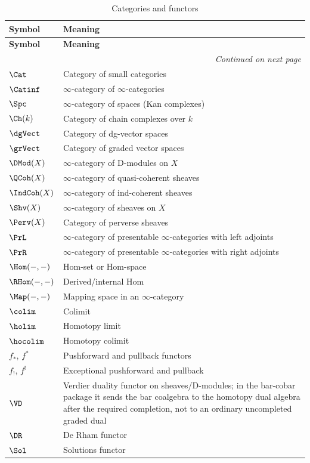 \begin{longtable}{p{3cm} p{10cm}}
\caption{Categories and functors} \\
\toprule
\textbf{Symbol} & \textbf{Meaning} \\
\midrule
\endfirsthead
\toprule
\textbf{Symbol} & \textbf{Meaning} \\
\midrule
\endhead
\midrule
\multicolumn{2}{r}{\textit{Continued on next page}} \\
\endfoot
\bottomrule
\endlastfoot

$\Cat$ & Category of small categories \\
$\Catinf$ & $\infty$-category of $\infty$-categories \\
$\Spc$ & $\infty$-category of spaces (Kan complexes) \\
$\Ch(k)$ & Category of chain complexes over $k$ \\
$\dgVect$ & Category of dg-vector spaces \\
$\grVect$ & Category of graded vector spaces \\
$\DMod(X)$ & $\infty$-category of D-modules on $X$ \\
$\QCoh(X)$ & $\infty$-category of quasi-coherent sheaves \\
$\IndCoh(X)$ & $\infty$-category of ind-coherent sheaves \\
$\Shv(X)$ & $\infty$-category of sheaves on $X$ \\
$\Perv(X)$ & Category of perverse sheaves \\
$\PrL$ & $\infty$-category of presentable $\infty$-categories with left adjoints \\
$\PrR$ & $\infty$-category of presentable $\infty$-categories with right adjoints \\
$\Hom(-, -)$ & Hom-set or Hom-space \\
$\RHom(-, -)$ & Derived/internal Hom \\
$\Map(-, -)$ & Mapping space in an $\infty$-category \\
$\colim$ & Colimit \\
$\holim$ & Homotopy limit \\
$\hocolim$ & Homotopy colimit \\
$f_*$, $f^*$ & Pushforward and pullback functors \\
$f_!$, $f^!$ & Exceptional pushforward and pullback \\
$\VD$ & Verdier duality functor on sheaves/D-modules; in the bar-cobar package it sends the bar coalgebra to the homotopy dual algebra after the required completion, not to an ordinary uncompleted graded dual \\
$\DR$ & De Rham functor \\
$\Sol$ & Solutions functor \\
\end{longtable}


